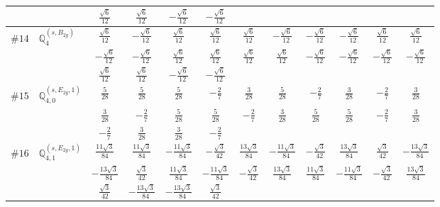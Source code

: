 \documentclass[fleqn,9pt,landscape]{jsarticle}
\begin{document}
\begin{center}
\begin{longtable}{lcccccccccc}
& $ \frac{\sqrt{6}}{12} $ & $ \frac{\sqrt{6}}{12} $ & $ - \frac{\sqrt{6}}{12} $ & $ - \frac{\sqrt{6}}{12} $ & $  $ & $  $ & $  $ & $  $ & $  $ & $  $ \\ \hline
$ \#14\quad \mathbb{Q}_{4}^{(s,B_{2g})} $ & $ \frac{\sqrt{6}}{12} $ & $ - \frac{\sqrt{6}}{12} $ & $ \frac{\sqrt{6}}{12} $ & $ \frac{\sqrt{6}}{12} $ & $ \frac{\sqrt{6}}{12} $ & $ - \frac{\sqrt{6}}{12} $ & $ - \frac{\sqrt{6}}{12} $ & $ - \frac{\sqrt{6}}{12} $ & $ \frac{\sqrt{6}}{12} $ & $ \frac{\sqrt{6}}{12} $ \\
& $ - \frac{\sqrt{6}}{12} $ & $ - \frac{\sqrt{6}}{12} $ & $ \frac{\sqrt{6}}{12} $ & $ \frac{\sqrt{6}}{12} $ & $ \frac{\sqrt{6}}{12} $ & $ \frac{\sqrt{6}}{12} $ & $ - \frac{\sqrt{6}}{12} $ & $ - \frac{\sqrt{6}}{12} $ & $ - \frac{\sqrt{6}}{12} $ & $ - \frac{\sqrt{6}}{12} $ \\
& $ \frac{\sqrt{6}}{12} $ & $ \frac{\sqrt{6}}{12} $ & $ - \frac{\sqrt{6}}{12} $ & $ - \frac{\sqrt{6}}{12} $ & $  $ & $  $ & $  $ & $  $ & $  $ & $  $ \\ \hline
$ \#15\quad \mathbb{Q}_{4,0}^{(s,E_{2g},1)} $ & $ \frac{5}{28} $ & $ \frac{5}{28} $ & $ \frac{5}{28} $ & $ - \frac{2}{7} $ & $ \frac{3}{28} $ & $ \frac{5}{28} $ & $ - \frac{2}{7} $ & $ \frac{3}{28} $ & $ - \frac{2}{7} $ & $ \frac{3}{28} $ \\
& $ \frac{3}{28} $ & $ - \frac{2}{7} $ & $ \frac{5}{28} $ & $ \frac{5}{28} $ & $ - \frac{2}{7} $ & $ \frac{3}{28} $ & $ \frac{5}{28} $ & $ \frac{5}{28} $ & $ - \frac{2}{7} $ & $ \frac{3}{28} $ \\
& $ - \frac{2}{7} $ & $ \frac{3}{28} $ & $ \frac{3}{28} $ & $ - \frac{2}{7} $ & $  $ & $  $ & $  $ & $  $ & $  $ & $  $ \\ \hline
$ \#16\quad \mathbb{Q}_{4,1}^{(s,E_{2g},1)} $ & $ \frac{11 \sqrt{3}}{84} $ & $ \frac{11 \sqrt{3}}{84} $ & $ - \frac{11 \sqrt{3}}{84} $ & $ - \frac{\sqrt{3}}{42} $ & $ \frac{13 \sqrt{3}}{84} $ & $ - \frac{11 \sqrt{3}}{84} $ & $ - \frac{\sqrt{3}}{42} $ & $ \frac{13 \sqrt{3}}{84} $ & $ \frac{\sqrt{3}}{42} $ & $ - \frac{13 \sqrt{3}}{84} $ \\
& $ - \frac{13 \sqrt{3}}{84} $ & $ \frac{\sqrt{3}}{42} $ & $ \frac{11 \sqrt{3}}{84} $ & $ - \frac{11 \sqrt{3}}{84} $ & $ - \frac{\sqrt{3}}{42} $ & $ \frac{13 \sqrt{3}}{84} $ & $ \frac{11 \sqrt{3}}{84} $ & $ - \frac{11 \sqrt{3}}{84} $ & $ - \frac{\sqrt{3}}{42} $ & $ \frac{13 \sqrt{3}}{84} $ \\
& $ \frac{\sqrt{3}}{42} $ & $ - \frac{13 \sqrt{3}}{84} $ & $ - \frac{13 \sqrt{3}}{84} $ & $ \frac{\sqrt{3}}{42} $ & $  $ & $  $ & $  $ & $  $ & $  $ & $  $ \\ \hline

\end{longtable}
\end{center}
\end{document}
